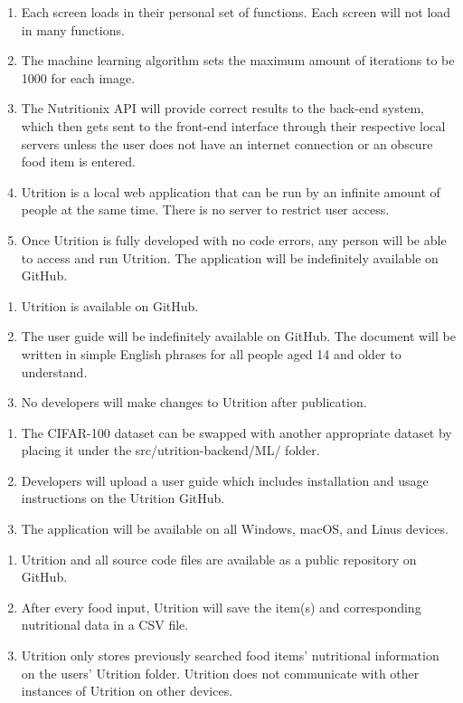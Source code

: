 \documentclass[12pt, titlepage]{article}
\begin{document}
\begin{enumerate}[{PR}1. ]
	\item Each screen loads in their personal set of functions. Each screen will not load in many functions.
	\item The machine learning algorithm sets the maximum amount of iterations to be 1000 for each image.
	\item The Nutritionix API will provide correct results to the back-end system, which then gets sent to the front-end interface through their respective local servers unless the user does not have an internet connection or an obscure food item is entered.
	\item Utrition is a local web application that can be run by an infinite amount of people at the same time. There is no server to restrict user access.
	\item Once Utrition is fully developed with no code errors, any person will be able to access and run Utrition. The application will be indefinitely available on GitHub.
\end{enumerate}

\begin{enumerate}[{OE}1. ]
	\item Utrition is available on GitHub.
	\item The user guide will be indefinitely available on GitHub. The document will be written in simple English phrases for all people aged 14 and older to understand.
	\item No developers will make changes to Utrition after publication.
\end{enumerate}

\begin{enumerate}[{MS}1. ]
	\item The CIFAR-100 dataset can be swapped with another appropriate dataset by placing it under the src/utrition-backend/ML/ folder.
	\item Developers will upload a user guide which includes installation and usage instructions on the Utrition GitHub.
	\item The application will be available on all Windows, macOS, and Linus devices.
\end{enumerate}

\begin{enumerate}[{SR}1. ]
	\item Utrition and all source code files are available as a public repository on GitHub.
	\item After every food input, Utrition will save the item(s) and corresponding nutritional data in a CSV file.
	\item Utrition only stores previously searched food items’ nutritional information on the users’ Utrition folder. Utrition does not communicate with other instances of Utrition on other devices.
\end{enumerate}
\end{document}
